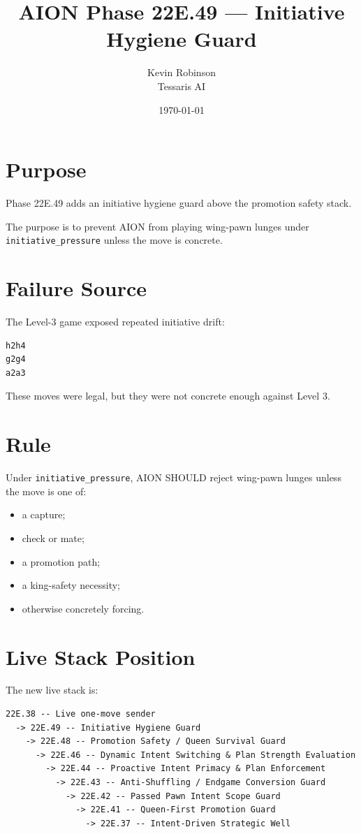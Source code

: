 \documentclass[11pt,a4paper]{article}
\title{\textbf{AION Phase 22E.49 --- Initiative Hygiene Guard}}
\author{Kevin Robinson\\Tessaris AI}
\date{\today}
\begin{document}
\maketitle

\section{Purpose}

Phase 22E.49 adds an initiative hygiene guard above the promotion safety stack.

The purpose is to prevent AION from playing wing-pawn lunges under \texttt{initiative\_pressure} unless the move is concrete.

\section{Failure Source}

The Level-3 game exposed repeated initiative drift:

\begin{verbatim}
h2h4
g2g4
a2a3
\end{verbatim}

These moves were legal, but they were not concrete enough against Level 3.

\section{Rule}

Under \texttt{initiative\_pressure}, AION SHOULD reject wing-pawn lunges unless the move is one of:

\begin{itemize}
  \item a capture;
  \item check or mate;
  \item a promotion path;
  \item a king-safety necessity;
  \item otherwise concretely forcing.
\end{itemize}

\section{Live Stack Position}

The new live stack is:

\begin{verbatim}
22E.38 -- Live one-move sender
  -> 22E.49 -- Initiative Hygiene Guard
    -> 22E.48 -- Promotion Safety / Queen Survival Guard
      -> 22E.46 -- Dynamic Intent Switching & Plan Strength Evaluation
        -> 22E.44 -- Proactive Intent Primacy & Plan Enforcement
          -> 22E.43 -- Anti-Shuffling / Endgame Conversion Guard
            -> 22E.42 -- Passed Pawn Intent Scope Guard
              -> 22E.41 -- Queen-First Promotion Guard
                -> 22E.37 -- Intent-Driven Strategic Well
\end{verbatim}
\end{document}
